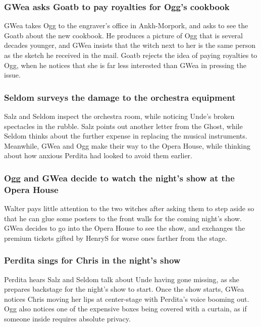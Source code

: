 \subsubsection{\Gls{GWea} asks \Gls{Goatb} to pay royalties for \Gls{Ogg}'s cookbook}
\Gls{GWea} takes \Gls{Ogg} to the engraver's office in Ankh-Morpork, and asks to see the \Gls{Goatb}
about the new cookbook. He produces a picture of \Gls{Ogg} that is several decades younger, and
\Gls{GWea} insists that the witch next to her is the same person as the sketch he received in the
mail. \Gls{Goatb} rejects the idea of paying royalties to \Gls{Ogg}, when he notices that she is
far less interested than \Gls{GWea} in pressing the issue.

\subsubsection{\Gls{Seldom} surveys the damage to the orchestra equipment}
\Gls{Salz} and \Gls{Seldom} inspect the orchestra room, while noticing \Gls{Unde}'s broken
spectacles in the rubble. \Gls{Salz} points out another letter from the \Gls{Ghost}, while
\Gls{Seldom} thinks about the further expense in replacing the musical instruments. Meanwhile,
\Gls{GWea} and \Gls{Ogg} make their way to the Opera House, while thinking about how anxious
\Gls{Perdita} had looked to avoid them earlier.

\subsubsection{\Gls{Ogg} and \Gls{GWea} decide to watch the night's show at the Opera House}
\Gls{Walter} pays little attention to the two witches after asking them to step aside so that he can
glue some posters to the front walls for the coming night's show. \Gls{GWea} decides to go into the
Opera House to see the show, and exchanges the premium tickets gifted by \Gls{HenryS} for worse
ones farther from the stage.

\subsubsection{\Gls{Perdita} sings for \Gls{Chris} in the night's show}
\Gls{Perdita} hears \Gls{Salz} and \Gls{Seldom} talk about \Gls{Unde} having gone missing, as she
prepares backstage for the night's show to start. Once the show starts, \Gls{GWea} notices
\Gls{Chris} moving her lips at center-stage with \Gls{Perdita}'s voice booming out. \Gls{Ogg} also
notices one of the expensive boxes being covered with a curtain, as if someone inside requires
absolute privacy.

